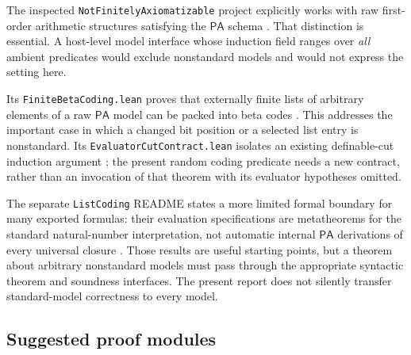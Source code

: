 \documentclass[11pt]{article}
\numberwithin{equation}{section}
\theoremstyle{definition}
\theoremstyle{remark}
\newcommand{\PA}{\mathsf{PA}}
\begin{document}
The inspected \texttt{NotFinitelyAxiomatizable} project explicitly works
with raw first-order arithmetic structures satisfying the $\PA$ schema
\cite{proveit-finite}. That distinction is essential. A host-level model
interface whose induction field ranges over \emph{all} ambient predicates
would exclude nonstandard models and would not express the setting here.

Its \texttt{FiniteBetaCoding.lean} proves that externally finite lists of
arbitrary elements of a raw $\PA$ model can be packed into beta codes
\cite{proveit-beta}. This addresses the important case in which a changed
bit position or a selected list entry is nonstandard. Its
\texttt{EvaluatorCutContract.lean} isolates an existing definable-cut
induction argument \cite{proveit-evaluator}; the present random coding
predicate needs a new contract, rather than an invocation of that theorem
with its evaluator hypotheses omitted.

The separate \texttt{ListCoding} README states a more limited formal
boundary for many exported formulas: their evaluation specifications are
metatheorems for the standard natural-number interpretation, not automatic
internal $\PA$ derivations of every universal closure \cite{proveit-list}.
Those results are useful starting points, but a theorem about arbitrary
nonstandard models must pass through the appropriate syntactic theorem and
soundness interfaces. The present report does not silently transfer
standard-model correctness to every model.

\subsection{Suggested proof modules}
\end{document}
